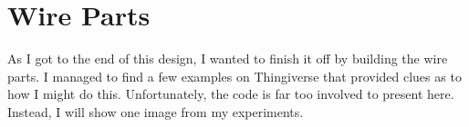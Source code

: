 \section{Wire Parts}

As I got to the end of this design, I wanted to finish it off by building the
wire parts. I managed to find a few examples on {Thingiverse} that provided
clues as to how I might do this. Unfortunately, the code is far too involved to
present here. Instead, I will show one image from my experiments. 



